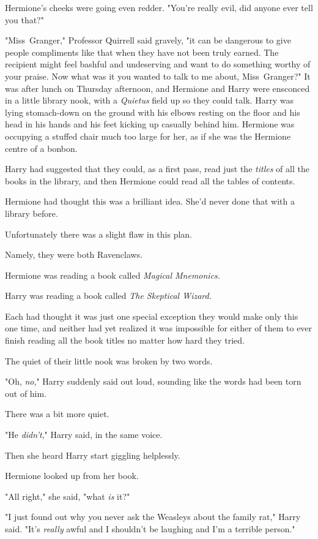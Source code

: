 Hermione's cheeks were going even redder. "You're really evil, did anyone ever
tell you that?"

"Miss~Granger," Professor Quirrell said gravely, "it can be dangerous to give
people compliments like that when they have not been truly earned. The
recipient might feel bashful and undeserving and want to do something worthy of
your praise. Now what was it you wanted to talk to me about, Miss~Granger?"
\later
It was after lunch on Thursday afternoon, and Hermione and Harry were ensconced
in a little library nook, with a \emph{Quietus} field up so they could talk.
Harry was lying stomach-down on the ground with his elbows resting on the floor
and his head in his hands and his feet kicking up casually behind him. Hermione
was occupying a stuffed chair much too large for her, as if she was the Hermione
centre of a bonbon.

Harry had suggested that they could, as a first pass, read just the
\emph{titles} of all the books in the library, and then Hermione could read all
the tables of contents.

Hermione had thought this was a brilliant idea. She'd never done that with a
library before.

Unfortunately there was a slight flaw in this plan.

Namely, they were both Ravenclaws.

Hermione was reading a book called \emph{Magical Mnemonics.}

Harry was reading a book called \emph{The Skeptical Wizard.}

Each had thought it was just one special exception they would make only this
one time, and neither had yet realized it was impossible for either of them to
ever finish reading all the book titles no matter how hard they tried.

The quiet of their little nook was broken by two words.

"Oh, \emph{no}," Harry suddenly said out loud, sounding like the words had been
torn out of him.

There was a bit more quiet.

"He \emph{didn't}," Harry said, in the same voice.

Then she heard Harry start giggling helplessly.

Hermione looked up from her book.

"All right," she said, "what \emph{is} it?"

"I just found out why you never ask the Weasleys about the family rat," Harry
said. "It's \emph{really} awful and I shouldn't be laughing and I'm a terrible
person."

